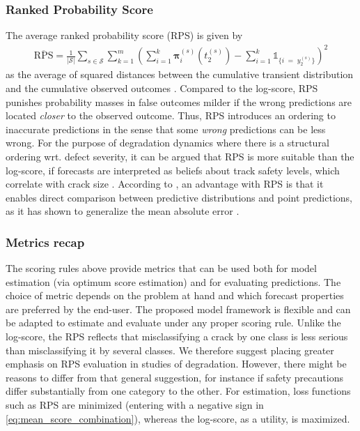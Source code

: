 \subsubsection{Ranked Probability Score}
The average ranked probability score (RPS) is given by
\begin{align}
    \overline{\text{RPS}} =\frac{1}{\vert \mathcal{S} \vert} \sum_{s \in \mathcal{S}} \sum_{k = 1}^m\left( \sum_{i = 1}^k\bm{\pi}^{(s)}_i\left( t_2^{(s)} \right)  - \sum_{i = 1}^k\mathds{1}_{ \{ i \; = \; y_2^{(s)} \} } \right)^2 \label{eq:RPS}
\end{align}
as the average of squared distances between the cumulative transient distribution and the cumulative observed outcomes \citep{Epstein1969}.
Compared to the log-score, RPS punishes probability masses in false outcomes milder if the wrong predictions are located \textit{closer} to the observed outcome. Thus, RPS introduces an ordering to inaccurate predictions in the sense that some \textit{wrong} predictions can be less wrong.
For the purpose of degradation dynamics where there is a structural ordering wrt. defect severity, it can be argued that RPS is more suitable than the log-score, if forecasts are interpreted as beliefs about track 
safety levels, which correlate with crack size \citep{UIC_2002_defecthandbook}. 
According to \citet{Czado2009}, an advantage with RPS is that it enables direct comparison between predictive distributions and point predictions, as it has shown to generalize the mean absolute error \citep{Hersbach2000}.



\subsubsection{Metrics recap} \label{sec:metrics_recap}
The scoring rules above provide metrics that can be used both for model estimation (via optimum score estimation) and for evaluating predictions. The choice of metric depends on the problem at hand and which forecast properties are preferred by the end-user. 
The proposed model framework is flexible and can be adapted to estimate and evaluate under any proper scoring rule.
Unlike the log-score, the RPS reflects that misclassifying a crack by one class is less serious than misclassifying it by several classes. We therefore suggest placing greater emphasis on RPS evaluation in studies of degradation. 
However, there might be reasons to differ from that general suggestion, for instance if safety precautions differ substantially from one category to the other.
For estimation, loss functions such as RPS are minimized (entering with a negative sign in \cref{eq:mean_score_combination}), whereas the log-score, as a utility, is maximized.


